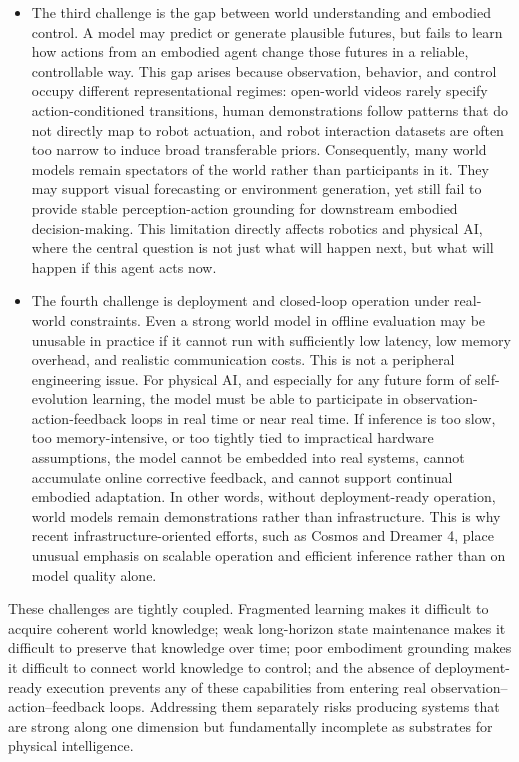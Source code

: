 \begin{itemize}
\item The third challenge is the gap between world understanding and embodied control. A model may predict or generate plausible futures, but fails to learn how actions from an embodied agent change those futures in a reliable, controllable way. This gap arises because observation, behavior, and control occupy different representational regimes: open-world videos rarely specify action-conditioned transitions, human demonstrations follow patterns that do not directly map to robot actuation, and robot interaction datasets are often too narrow to induce broad transferable priors. Consequently, many world models remain spectators of the world rather than participants in it. They may support visual forecasting or environment generation, yet still fail to provide stable perception-action grounding for downstream embodied decision-making. This limitation directly affects robotics and physical AI, where the central question is not just what will happen next, but what will happen if this agent acts now.

\item The fourth challenge is deployment and closed-loop operation under real-world constraints. Even a strong world model in offline evaluation may be unusable in practice if it cannot run with sufficiently low latency, low memory overhead, and realistic communication costs. This is not a peripheral engineering issue. For physical AI, and especially for any future form of self-evolution learning, the model must be able to participate in observation-action-feedback loops in real time or near real time. If inference is too slow, too memory-intensive, or too tightly tied to impractical hardware assumptions, the model cannot be embedded into real systems, cannot accumulate online corrective feedback, and cannot support continual embodied adaptation. In other words, without deployment-ready operation, world models remain demonstrations rather than infrastructure. This is why recent infrastructure-oriented efforts, such as Cosmos and Dreamer 4, place unusual emphasis on scalable operation and efficient inference rather than on model quality alone.
\end{itemize}



These challenges are tightly coupled. Fragmented learning makes it difficult to acquire coherent world knowledge; weak long-horizon state maintenance makes it difficult to preserve that knowledge over time; poor embodiment grounding makes it difficult to connect world knowledge to control; and the absence of deployment-ready execution prevents any of these capabilities from entering real observation–action–feedback loops. Addressing them separately risks producing systems that are strong along one dimension but fundamentally incomplete as substrates for physical intelligence.



